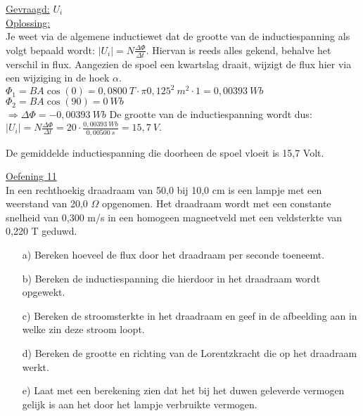 \documentclass[a4paper,12pt,twoside]{article}%
\begin{document}
\underline{Gevraagd:}
$U_i$ \\
\underline{Oplossing:}\\
Je weet via de algemene inductiewet dat de grootte van de inductiespanning als volgt bepaald wordt:
\(\left|U_i\right|=N\frac{\Delta\Phi}{\Delta t}.\)
Hiervan is reeds alles gekend, behalve het verschil in flux. Aangezien de spoel een kwartslag draait, wijzigt de flux hier via een wijziging in de hoek $\alpha$.\newline
$\Phi_1 = BA\cos(0)=0,0800~T\cdot\pi 0,125^2~m^2\cdot 1= 0,00393~Wb$\newline
$\Phi_2 = BA\cos(90) = 0~Wb$\\
$\Rightarrow \Delta\Phi = -0,00393~Wb$
De grootte van de inductiespanning wordt dus:
\(\left|U_i\right|=N\frac{\Delta\Phi}{\Delta t}=20\cdot\frac{0,00393~Wb}{0,00500~s}=15,7~V.\)

De gemiddelde inductiespanning die doorheen de spoel vloeit is 15,7 Volt. 


\newpage



\underline{Oefening 11}\\
In een rechthoekig draadraam van 50,0 bij 10,0 cm is een lampje met een weerstand van 20,0 $\Omega$ opgenomen. Het draadraam wordt met een constante snelheid van 0,300 m/s in een homogeen magneetveld met een veldsterkte van 0,220 T geduwd.
\begin{figure}[!h]
	\centering
\end{figure}
\begin{enumerate}
	\item[a)] Bereken hoeveel de flux door het draadraam per seconde toeneemt. 
	\item[b)] Bereken de inductiespanning die hierdoor in het draadraam wordt opgewekt. 
	\item[c)] Bereken de stroomsterkte in het draadraam en geef in de afbeelding aan in welke zin deze stroom loopt. 
	\item[d)] Bereken de grootte en richting van de Lorentzkracht die op het draadraam werkt. 
	\item[e)] Laat met een berekening zien dat het bij het duwen geleverde vermogen gelijk is aan het door het lampje verbruikte vermogen.
\end{enumerate}
\end{document}
